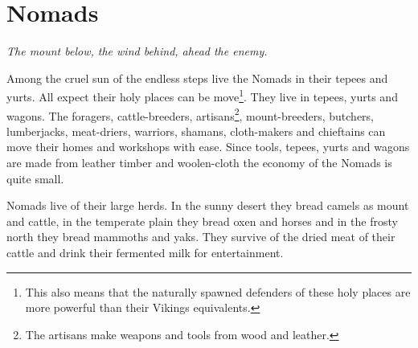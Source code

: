 \documentclass[a4paper]{book}
\begin{document}

\section{\Gls{Nomads}}

	\begin{flushright}
		\emph{The mount below, the wind behind, ahead the enemy.}
	\end{flushright}

	Among the cruel sun of the endless steps live the \gls{Nomads} in their tepees and yurts.
	All expect their holy places can be move\footnote{
		This also means that the naturally spawned defenders of these holy
		places are more powerful than their \gls{Vikings} equivalents.
	}.
	They live in tepees, yurts and wagons.
	The foragers, cattle-breeders, artisans\footnote{
		The artisans make weapons and tools from wood and leather.
	}, 
	mount-breeders, butchers, lumberjacks, meat-driers, warriors, shamans, cloth-makers 
	and chieftains can move their homes and workshops with ease.
	Since tools, tepees, yurts and wagons are made from leather timber and woolen-cloth
	the economy of the \gls{Nomads} is quite small.

	\Gls{Nomads} live of their large herds. In the sunny desert they bread camels as mount
	and cattle, in the temperate plain they bread oxen and horses and in the frosty north 
	they bread mammoths and yaks.
	They survive of the dried meat of their cattle and drink their fermented milk for
	entertainment.
\end{document}
